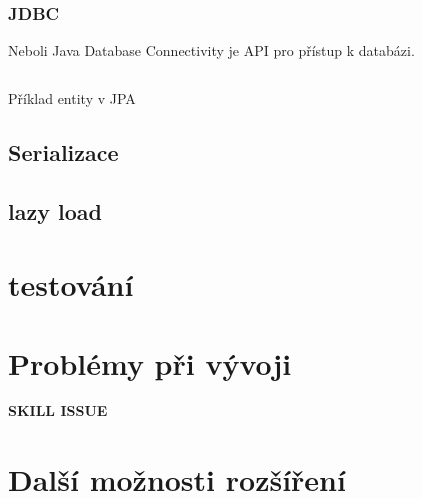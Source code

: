 \subsubsection*{JDBC}
Neboli Java Database Connectivity je API pro přístup k databázi.

\begin{listing}[ht!]
    \inputminted[]{Java}{resources/code/impl/EnemyDTO.java}
    \caption{Příklad entity v JPA}
    \label{code:jpa_entity}
\end{listing}


\subsection{Serializace}
\subsection{lazy load}
\section{testování}

\section{Problémy při vývoji}
\textbf{SKILL ISSUE}
\section{Další možnosti rozšíření}